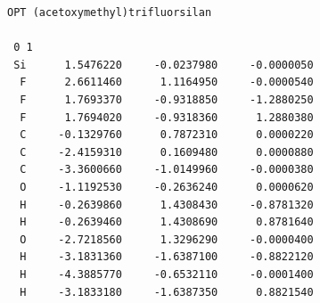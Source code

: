 \documentclass[
  digital, %
  table,   %
  lof,     %
  lot,     %
  oneside,
]{fithesis3}
\begin{document}
 \begin{lstlisting}[frame=single, caption={\ce{(acetoxymethyl)trifluorsilan} },label=DescriptiveLabel]
 OPT (acetoxymethyl)trifluorsilan

 0 1
 Si      1.5476220     -0.0237980     -0.0000050
  F      2.6611460      1.1164950     -0.0000540
  F      1.7693370     -0.9318850     -1.2880250
  F      1.7694020     -0.9318360      1.2880380
  C     -0.1329760      0.7872310      0.0000220
  C     -2.4159310      0.1609480      0.0000880
  C     -3.3600660     -1.0149960     -0.0000380
  O     -1.1192530     -0.2636240      0.0000620
  H     -0.2639860      1.4308430     -0.8781320
  H     -0.2639460      1.4308690      0.8781640
  O     -2.7218560      1.3296290     -0.0000400
  H     -3.1831360     -1.6387100     -0.8822120
  H     -4.3885770     -0.6532110     -0.0001400
  H     -3.1833180     -1.6387350      0.8821540

 \end{lstlisting}
\end{document}

